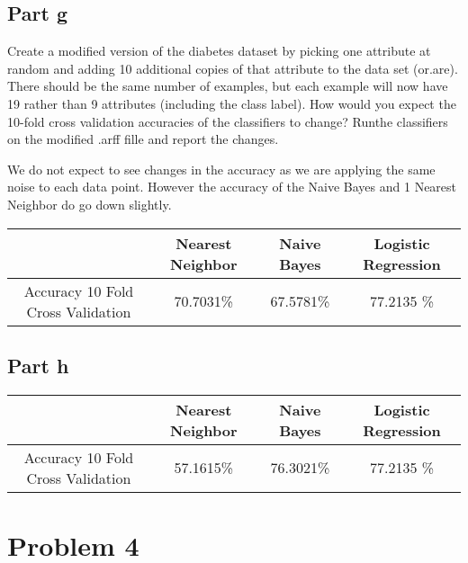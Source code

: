 \documentclass{article}
\begin{document}
\subsection{Part g}
Create a modified version of the diabetes dataset by picking one attribute at random and adding 10 additional copies of that attribute to the data set (or.are). There should be the same number of examples, but each example will now have 19 rather than 9 attributes (including the class label). How would you expect the 10-fold cross validation accuracies of the classifiers to change? Runthe classifiers on the modified .arff fille and report the changes.

We do not expect to see changes in the accuracy as we are applying the same noise to each data point. However the accuracy of the Naive Bayes and 1 Nearest Neighbor do go down slightly. 



\begin{table}[h]
    \begin{center}
    \begin{tabular}{|c|c|c|c|}
   \hline
        & Nearest Neighbor & Naive Bayes & Logistic Regression \\ \hline
         Accuracy 10 Fold Cross Validation &  70.7031\%&67.5781\% &  77.2135 \%  \\ \hline
        \end{tabular}
    \end{center}
\end{table}

\subsection{Part h}

\begin{table}[h]
    \begin{center}
    \begin{tabular}{|c|c|c|c|}
   \hline
        & Nearest Neighbor & Naive Bayes & Logistic Regression \\ \hline
         Accuracy 10 Fold Cross Validation &  57.1615\%&76.3021\% &  77.2135 \%  \\ \hline
        \end{tabular}
    \end{center}
\end{table}


\section{Problem 4}
\end{document}
